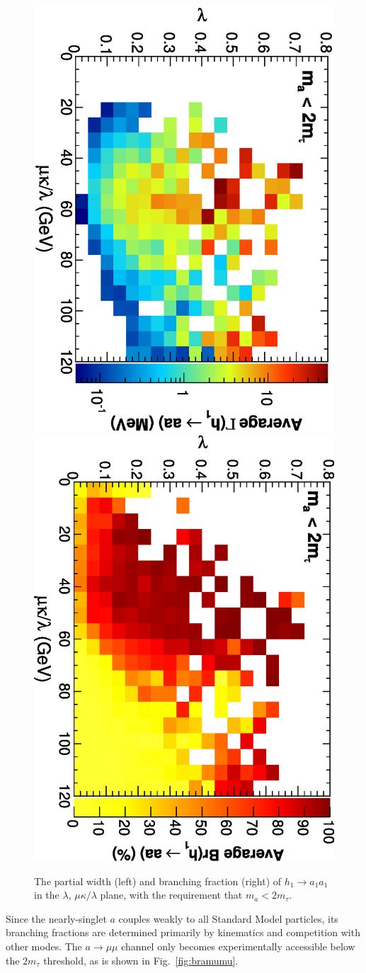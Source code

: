 \documentclass[aps,12pt,superscriptaddress,nofootinbib,floatfix,showpacs]{revtex4}
\begin{document}
\begin{figure}
\includegraphics[height=0.48\linewidth, angle=90]{plots/newbranching/gammahaa_vs_lambda_vs_mkoverl.eps}
\includegraphics[height=0.48\linewidth, angle=90]{plots/newbranching/brhaa_vs_lambda_vs_mkoverl.eps}
\caption{The partial width (left) and branching fraction (right) of
  $h_1 \to a_1a_1$ in the $\lambda$, $\mu\kappa/\lambda$
  plane, with the requirement that $m_a < 2m_\tau$.  \label{fig:brhaa}}
\end{figure}

Since the nearly-singlet $a$ couples weakly to all Standard Model
particles, its branching fractions are determined primarily by
kinematics and competition with other modes.  The $a \to \mu\mu$
channel only becomes experimentally accessible below the $2m_\tau$
threshold, as is shown in Fig.~\ref{fig:bramumu}.
\end{document}
